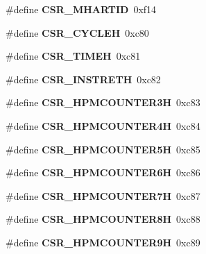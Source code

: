 \begin{DoxyCompactItemize}
\#define {\bfseries C\+S\+R\+\_\+\+M\+H\+A\+R\+T\+ID}~0xf14
\item 
\mbox{\label{riscv-utility_8h_af68e1fabef0868e0d41d8e69ba55cce9}} 
\#define {\bfseries C\+S\+R\+\_\+\+C\+Y\+C\+L\+EH}~0xc80
\item 
\mbox{\label{riscv-utility_8h_a2e2ce9bac3d1ad2128a4eb9438a1022d}} 
\#define {\bfseries C\+S\+R\+\_\+\+T\+I\+M\+EH}~0xc81
\item 
\mbox{\label{riscv-utility_8h_af1e2e4353b163d307d974806a0031407}} 
\#define {\bfseries C\+S\+R\+\_\+\+I\+N\+S\+T\+R\+E\+TH}~0xc82
\item 
\mbox{\label{riscv-utility_8h_a315ee54d99aa0fbed5532e5bcf6e2d94}} 
\#define {\bfseries C\+S\+R\+\_\+\+H\+P\+M\+C\+O\+U\+N\+T\+E\+R3H}~0xc83
\item 
\mbox{\label{riscv-utility_8h_a426e2ddee52a86c29a9829c66b5c0eb5}} 
\#define {\bfseries C\+S\+R\+\_\+\+H\+P\+M\+C\+O\+U\+N\+T\+E\+R4H}~0xc84
\item 
\mbox{\label{riscv-utility_8h_ac1e9d2a6cf60d54c39002292a21af314}} 
\#define {\bfseries C\+S\+R\+\_\+\+H\+P\+M\+C\+O\+U\+N\+T\+E\+R5H}~0xc85
\item 
\mbox{\label{riscv-utility_8h_a5c7c0dc282f4787f6d7070331a3b9784}} 
\#define {\bfseries C\+S\+R\+\_\+\+H\+P\+M\+C\+O\+U\+N\+T\+E\+R6H}~0xc86
\item 
\mbox{\label{riscv-utility_8h_acac7fd3e7f29c8a8ed9c76647f4e1622}} 
\#define {\bfseries C\+S\+R\+\_\+\+H\+P\+M\+C\+O\+U\+N\+T\+E\+R7H}~0xc87
\item 
\mbox{\label{riscv-utility_8h_ae2af5d7df5e784a4686d3cc941220cbe}} 
\#define {\bfseries C\+S\+R\+\_\+\+H\+P\+M\+C\+O\+U\+N\+T\+E\+R8H}~0xc88
\item 
\mbox{\label{riscv-utility_8h_a4bd36c6e299b2a4460240f1076d23e29}} 
\#define {\bfseries C\+S\+R\+\_\+\+H\+P\+M\+C\+O\+U\+N\+T\+E\+R9H}~0xc89
\item 
\mbox{\label{riscv-utility_8h_af5581f64a316e30e7c3cbbb5922b1c11}} 

\end{DoxyCompactItemize}
